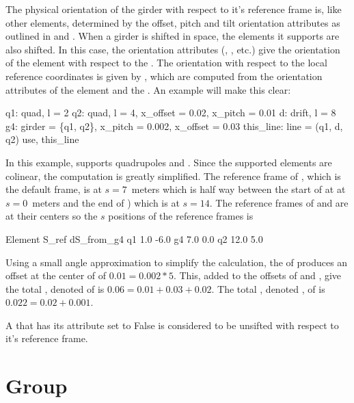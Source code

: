 The physical orientation of the girder with respect to it's reference
frame is, like other elements, determined by the offset, pitch and
tilt orientation attributes as outlined in  and
.  When a girder is shifted in space, the elements
it supports are also shifted.  In this case, the orientation
attributes (, , etc.) give the orientation of
the element with respect to the . The orientation with
respect to the local reference coordinates is given by
, which are computed from the orientation attributes
of the element and the . An example will make this clear:
\begin{example}
  q1: quad, l = 2
  q2: quad, l = 4, x_offset = 0.02, x_pitch = 0.01
  d: drift, l = 8
  g4: girder = \{q1, q2\}, x_pitch = 0.002, x_offset = 0.03
  this_line: line = (q1, d, q2)
  use, this_line
\end{example}
In this example,  supports quadrupoles  and .
Since the supported elements are colinear, the computation is greatly
simplified. The reference frame of , which is the default
 frame, is at $s = 7$~meters which is half way between the
start of  at at $s = 0$~meters and the end of ) which is
at $s = 14$. The reference frames of  and  are at their
centers so the $s$ positions of the reference frames is
\begin{example}
  Element        S_ref   dS_from_g4
  q1             1.0     -6.0
  g4             7.0      0.0
  q2            12.0      5.0
\end{example}
Using a small angle approximation to simplify the calculation, the  of  produces
an offset at the center of  of $0.01 = 0.002 * 5$. This, added to the offsets of  and
, give the total , denoted  of  is $0.06 = 0.01 + 0.03 +
0.02$. The total , denoted , of  is $0.022 = 0.02 + 0.001$.

A  that has its  attribute set to False is considered to be
unsifted with respect to it's reference frame.

\section{Group}
\label{s:group}

